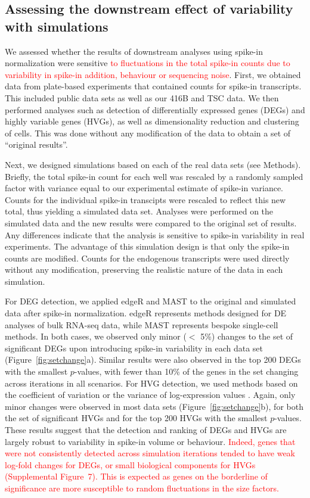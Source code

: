\documentclass{article}
\newcommand{\suppfiglostsim}{7}
\newcommand{\revised}[1]{\textcolor{red}{#1}}
\begin{document}
\subsection*{Assessing the downstream effect of variability with simulations}
We assessed whether the results of downstream analyses using spike-in normalization were sensitive \revised{to fluctuations in the total spike-in counts due to variability in spike-in addition, behaviour or sequencing noise}.
First, we obtained data from plate-based experiments that contained counts for spike-in transcripts.
This included public data sets \autocite{segerstople2016single,islam2011characterization} as well as our 416B and TSC data.
We then performed analyses such as detection of differentially expressed genes (DEGs) and highly variable genes (HVGs), as well as dimensionality reduction and clustering of cells.
This was done without any modification of the data to obtain a set of ``original results''.

Next, we designed simulations based on each of the real data sets (see Methods).
Briefly, the total spike-in count for each well was rescaled by a randomly sampled factor with variance equal to our experimental estimate of spike-in variance.
Counts for the individual spike-in transcipts were rescaled to reflect this new total, thus yielding a simulated data set.
Analyses were performed on the simulated data and the new results were compared to the original set of results.
Any differences indicate that the analysis is sensitive to spike-in variability in real experiments.
The advantage of this simulation design is that only the spike-in counts are modified.
Counts for the endogenous transcripts were used directly without any modification, preserving the realistic nature of the data in each simulation.

For DEG detection, we applied edgeR \autocite{robinson2010edgeR} and MAST \autocite{finak2015mast} to the original and simulated data after spike-in normalization.
edgeR represents methods designed for DE analyses of bulk RNA-seq data, while MAST represents bespoke single-cell methods.
In both cases, we observed only minor ($<$ 5\%) changes to the set of significant DEGs upon introducing spike-in variability in each data set (Figure~\ref{fig:setchange}a). 
Similar results were also observed in the top 200 DEGs with the smallest $p$-values, with fewer than 10\% of the genes in the set changing across iterations in all scenarios.
For HVG detection, we used methods based on the coefficient of variation \autocite{brennecke2013accounting} or the variance of log-expression values \autocite{lun2016stepbystep}.
Again, only minor changes were observed in most data sets (Figure~\ref{fig:setchange}b), for both the set of significant HVGs and for the top 200 HVGs with the smallest $p$-values.
These results suggest that the detection and ranking of DEGs and HVGs are largely robust to variability in spike-in volume or behaviour.
\revised{Indeed, genes that were not consistently detected across simulation iterations tended to have weak log-fold changes for DEGs, or small biological components for HVGs (Supplemental Figure~\suppfiglostsim{}).
This is expected as genes on the borderline of significance are more susceptible to random fluctuations in the size factors.}
\end{document}
